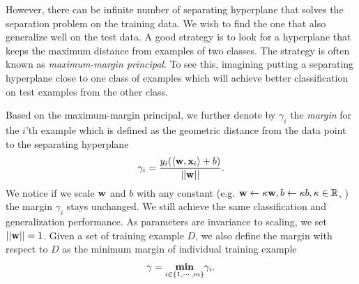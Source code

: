 {However, there can be infinite number of separating hyperplane that solves the separation problem on the training data.
We wish to find the one that also generalize well on the test data.
A good strategy is to look for a hyperplane that keeps the maximum distance from examples of two classes.
The strategy is often known as \textit{maximum-margin principal}.
To see this, imagining putting a separating hyperplane close to one class of examples which will achieve better classification on test examples from the other class.

Based on the maximum-margin principal, we further denote by $\gamma_i$ the \textit{margin} for the $i$'th example which is defined as the geometric distance from the data point to the separating hyperplane
\begin{align*}
	\gamma_i = \frac{y_i(\langle \mathbf {w}, \mathbf {x}_i \rangle+b)}{\left|\left| \mathbf {w} \right|\right|}.
\end{align*}
We notice if we scale $\mathbf {w}$ and $b$ with any constant (e.g. $\mathbf {w}\leftarrow\kappa\mathbf {w}, b\leftarrow\kappa b, \kappa\in\mathbb{R}$, ) the margin $\gamma_i$ stays unchanged. 
We still achieve the same classification and generalization performance.
As parameters are invariance to scaling, we set $\left|\left| \mathbf {w} \right|\right|=1$.
Given a set of training example $D$, we also define the margin with respect to $D$ as the minimum margin of individual training example
\begin{align*}
	\gamma = \underset{i\in\{1,\cdots,m\}}{\textbf{min}}\gamma_i.
\end{align*}

}
